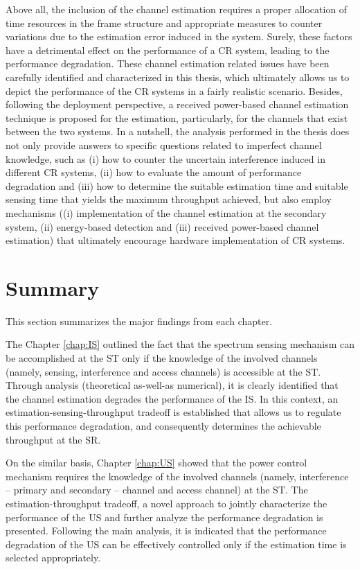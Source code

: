 Above all, the inclusion of the channel estimation requires a proper allocation of time resources in the frame structure and appropriate measures to counter variations due to the estimation error induced in the system. Surely, these factors have a detrimental effect on the performance of a CR system, leading to the performance degradation. These channel estimation related issues have been carefully identified and characterized in this thesis, which ultimately allows us to depict the performance of the CR systems in a fairly realistic scenario. Besides, following the deployment perspective, a received power-based channel estimation technique is proposed for the estimation, particularly, for the channels that exist between the two systems. In a nutshell, the analysis performed in the thesis does not only provide answers to specific questions related to imperfect channel knowledge, such as (i) how to counter the uncertain interference induced in different CR systems, (ii) how to evaluate the amount of performance degradation and (iii) how to determine the suitable estimation time and suitable sensing time that yields the maximum throughput achieved, but also employ mechanisms ((i) implementation of the channel estimation at the secondary system, (ii) energy-based detection and (iii) received power-based channel estimation) that ultimately encourage hardware implementation of CR systems. 


\section{Summary}
This section summarizes the major findings from each chapter. 

The Chapter \ref{chap:IS} outlined the fact that the spectrum sensing mechanism can be accomplished at the ST only if the knowledge of the involved channels (namely, sensing, interference and access channels) is accessible at the ST. Through analysis (theoretical as-well-as numerical), it is clearly identified that the channel estimation degrades the performance of the IS. In this context, an estimation-sensing-throughput tradeoff is established that allows us to regulate this performance degradation, and consequently determines the achievable throughput at the SR.

On the similar basis, Chapter \ref{chap:US} showed that the power control mechanism requires the knowledge of the involved channels (namely, interference -- primary and secondary -- channel and access channel) at the ST. The estimation-throughput tradeoff, a novel approach to jointly characterize the performance of the US and further analyze the performance degradation is presented. Following the main analysis, it is indicated that the performance degradation of the US can be effectively controlled only if the estimation time is selected appropriately.   

